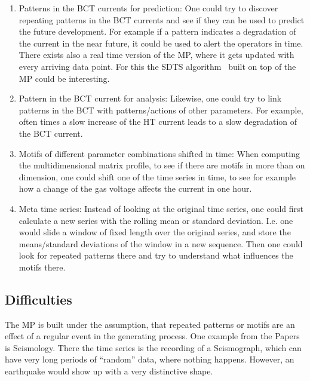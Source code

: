 \documentclass[12pt,a4paper]{article}
\providecommand{\tightlist}{%
	\setlength{\itemsep}{0pt}\setlength{\parskip}{0pt}}
\begin{document}
\begin{enumerate}
\def\labelenumi{\arabic{enumi}.}
\tightlist
	\item
	  Patterns in the BCT currents for prediction: One could try to discover repeating patterns in the BCT currents and see if they can be used to predict the future development. For example if a pattern indicates a degradation of the current in the near future, it could be used to alert the operators in time. There exists also a real time version of the MP, where it gets updated with every arriving data point. For this the SDTS algorithm~\cite{Yeh:MatrixProfileIV} built on top of the MP could be interesting.
	\item
	  Pattern in the BCT current for analysis: Likewise, one could try to link patterns in the BCT with patterns/actions of other parameters. For example, often times a slow increase of the HT current leads to a slow degradation of the BCT current.
	\item
	  Motifs of different parameter combinations shifted in time: When computing the multidimensional matrix profile, to see if there are
	  motifs in more than on dimension, one could shift one of the time series in time, to see for example how a change of the gas voltage affects the current in one hour.
	\item
	  Meta time series: Instead of looking at the original time series, one could first calculate a new series with the rolling mean or standard deviation. I.e. one would slide a window of fixed length over the original series, and store the means/standard deviations of the window in a new sequence. Then one could look for repeated patterns there and try to understand what influences the motifs there.
\end{enumerate}

\hypertarget{difficulties}{%
\subsection{Difficulties}\label{difficulties}}

The MP is built under the assumption, that repeated patterns or motifs are an effect of a regular event in the generating process. One example from the Papers is Seismology. There the time series is the recording of a Seismograph, which can have very long periods of ``random'' data, where nothing happens. However, an earthquake would show up with a very distinctive shape.
\end{document}
